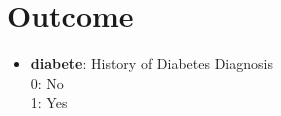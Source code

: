 \documentclass[11pt]{article}
\begin{document}
\section{Outcome}
\begin{itemize}
\item \textbf{diabete}: History of Diabetes  Diagnosis \\
    0: No \\
    1: Yes
\end{itemize}
\end{document}

